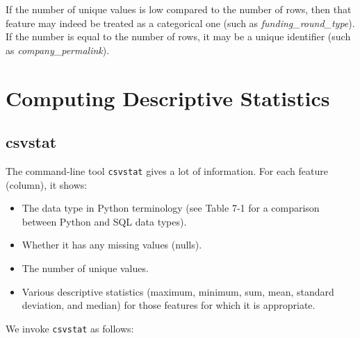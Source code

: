 \documentclass[
]{book}
\providecommand{\tightlist}{%
  \setlength{\itemsep}{0pt}\setlength{\parskip}{0pt}}
\theoremstyle{definition}
\theoremstyle{definition}
\theoremstyle{definition}
\theoremstyle{remark}
\begin{document}
If the number of unique values is low compared to the number of rows, then that feature may indeed be treated as a categorical one (such as \emph{funding\_round\_type}). If the number is equal to the number of rows, it may be a unique identifier (such as \emph{company\_permalink}).

\hypertarget{computing-descriptive-statistics}{%
\section{Computing Descriptive Statistics}\label{computing-descriptive-statistics}}

\hypertarget{csvstat}{%
\subsection{csvstat}\label{csvstat}}

The command-line tool \texttt{csvstat} gives a lot of information. For each feature (column), it shows:

\begin{itemize}
\tightlist
\item
  The data type in Python terminology (see Table 7-1 for a comparison between Python and SQL data types).
\item
  Whether it has any missing values (nulls).
\item
  The number of unique values.
\item
  Various descriptive statistics (maximum, minimum, sum, mean, standard deviation, and median) for those features for which it is appropriate.
\end{itemize}

We invoke \texttt{csvstat} as follows:
\end{document}
